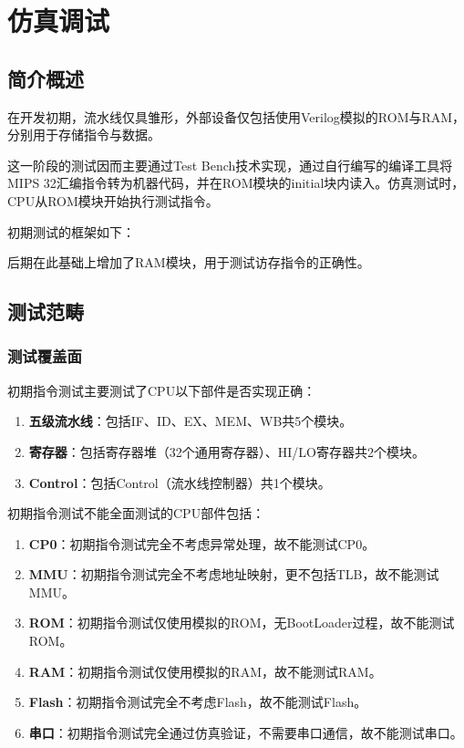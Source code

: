 \chapter{仿真调试}

\section{简介概述}

在开发初期，流水线仅具雏形，外部设备仅包括使用Verilog模拟的ROM与RAM，分别用于存储指令与数据。

这一阶段的测试因而主要通过Test Bench技术实现，通过自行编写的编译工具将MIPS 32汇编指令转为机器代码，并在ROM模块的initial块内读入。仿真测试时，CPU从ROM模块开始执行测试指令。

初期测试的框架如下：


后期在此基础上增加了RAM模块，用于测试访存指令的正确性。


\section{测试范畴}

\subsection{测试覆盖面}


初期指令测试主要测试了CPU以下部件是否实现正确：

\begin{enumerate}
    \item {\bf 五级流水线}：包括IF、ID、EX、MEM、WB共5个模块。
    \item {\bf 寄存器}：包括寄存器堆（32个通用寄存器）、HI/LO寄存器共2个模块。
    \item {\bf Control}：包括Control（流水线控制器）共1个模块。
\end{enumerate}

初期指令测试不能全面测试的CPU部件包括：

\begin{enumerate}
    \item {\bf CP0}：初期指令测试完全不考虑异常处理，故不能测试CP0。
    \item {\bf MMU}：初期指令测试完全不考虑地址映射，更不包括TLB，故不能测试MMU。
    \item {\bf ROM}：初期指令测试仅使用模拟的ROM，无BootLoader过程，故不能测试ROM。
    \item {\bf RAM}：初期指令测试仅使用模拟的RAM，故不能测试RAM。
    \item {\bf Flash}：初期指令测试完全不考虑Flash，故不能测试Flash。
    \item {\bf 串口}：初期指令测试完全通过仿真验证，不需要串口通信，故不能测试串口。
\end{enumerate}

